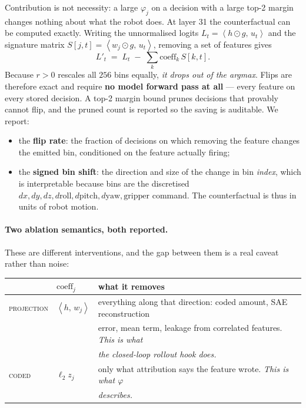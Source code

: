 \documentclass[11pt]{article}
\newcommand{\ip}[2]{\left\langle #1,\, #2 \right\rangle}
\begin{document}
Contribution is not necessity: a large $\varphi_j$ on a decision with a large top-2 margin
changes nothing about what the robot does. At layer 31 the counterfactual can be computed
exactly. Writing the unnormalised logits $L_t = \ip{h\odot g}{u_t}$ and the signature matrix
$S[j,t] = \ip{w_j\odot g}{u_t}$, removing a set of features gives
\begin{equation}
L'_t \;=\; L_t \;-\; \sum_{k} \mathrm{coeff}_k\, S[k,t].
\label{eq:cf}
\end{equation}
Because $r>0$ rescales all $256$ bins equally, \emph{it drops out of the argmax}. Flips are
therefore exact and require \textbf{no model forward pass at all} --- every feature on every
stored decision. A top-2 margin bound prunes decisions that provably cannot flip, and the
pruned count is reported so the saving is auditable. We report:
\begin{itemize}
\item the \textbf{flip rate}: the fraction of decisions on which removing the feature changes
      the emitted bin, conditioned on the feature actually firing;
\item the \textbf{signed bin shift}: the direction and size of the change in bin \emph{index},
      which is interpretable because bins are the discretised
      $dx,dy,dz,d\mathrm{roll},d\mathrm{pitch},d\mathrm{yaw},\mathrm{gripper}$ command. The
      counterfactual is thus in units of robot motion.
\end{itemize}

\paragraph{Two ablation semantics, both reported.} These are different interventions, and the
gap between them is a real caveat rather than noise:

\begin{center}
\begin{tabular}{@{}lll@{}}
\toprule
 & $\mathrm{coeff}_j$ & what it removes \\
\midrule
\textsc{projection} & $\ip{h}{w_j}$ &
  everything along that direction: coded amount, SAE reconstruction \\
 & & error, mean term, leakage from correlated features. \emph{This is what} \\
 & & \emph{the closed-loop rollout hook does.} \\
\addlinespace
\textsc{coded} & $\ell_2 z_j$ &
  only what attribution says the feature wrote. \emph{This is what $\varphi$} \\
 & & \emph{describes.} \\
\bottomrule
\end{tabular}
\end{center}
\end{document}
